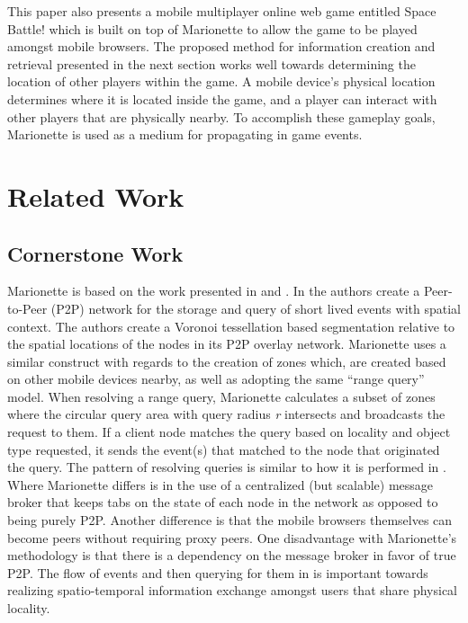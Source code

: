 \documentclass[12pt]{report}	%
\theoremstyle{definition}
\theoremstyle{remark}
\begin{document}
This paper also presents a mobile multiplayer online web game entitled
Space Battle! which is built on top of Marionette to allow the game to be played amongst 
mobile browsers. The proposed method for information creation and retrieval 
presented in the next section works well towards determining the location of other 
players within the game. 
A mobile device's physical location determines where it is located inside 
the game, and a player can interact with other players
that are physically nearby. To accomplish these gameplay
goals, Marionette is used as a medium for propagating in game events.

\chapter{Related Work}

\section{Cornerstone Work}

Marionette is based on the work presented in
\cite{zio2011p2p} and
\cite{yoneki2007socio}. In
\cite{zio2011p2p} the authors create a Peer-to-Peer
(P2P) network for the storage and query of short lived events with
spatial context. The authors create a Voronoi tessellation based
segmentation relative to the spatial locations of the nodes in its P2P
overlay network. Marionette uses a similar construct with regards to the
creation of zones which, are created based on other mobile devices nearby, as well
as adopting the same ``range query'' model. When resolving a range query,
Marionette calculates a subset of zones where the circular query area with 
query radius \textit{r} intersects and broadcasts the request to them. If a client 
node matches the query based on locality and object type requested,
it sends the event(s) that matched to the node that originated the
query. The pattern of resolving queries is similar to how it is
performed in \cite{zio2011p2p}. Where Marionette
differs is in the use of a centralized (but scalable) message broker
that keeps tabs on the state of each node in the network as opposed to
being purely P2P. Another difference is that the mobile browsers
themselves can become peers without requiring proxy peers.
One disadvantage with Marionette's methodology is that there is a
dependency on the message broker in favor of true P2P. The flow of
events and then querying for them in \cite{zio2011p2p}
is important towards realizing spatio-temporal information exchange
amongst users that share physical locality.
\end{document}
